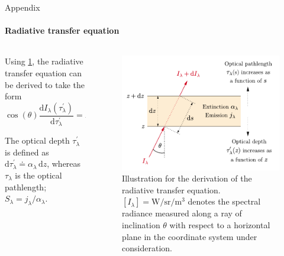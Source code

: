 \documentclass{beamer}
\begin{document}
\begin{frame}[allowframebreaks]{Appendix}
	\framesubtitle{Radiative transfer equation}
	\begin{columns} 
		\begin{column}{.6\textwidth}
			Using \cref{fig:radiative-transfer-equation}, the radiative transfer equation can be derived to take the form
			\begin{equation}\label{eq:transportequationdiffform_opt_depth}
				\cos(\theta)\frac{\mathrm{d}I_\lambda(\tau^\prime_\lambda)}{\mathrm{d}\tau^\prime_\lambda} = I_\lambda(\tau^\prime_\lambda) - S_\lambda(\tau^\prime_\lambda).
			\end{equation} 
			
			The optical depth $\tau_{\lambda}^\prime$ is defined as $\mathrm{d}\tau_{\lambda}^\prime \doteq \alpha_\lambda\,\mathrm{d}z$, whereas $\tau_{\lambda}$ is the optical pathlength; $S_\lambda = j_\lambda/\alpha_\lambda$.
		\end{column}
		\begin{column}{.4\textwidth}
			\begin{figure}[h]
				\centering
				\includegraphics[width=\textwidth]{figures/thesis/radiative-transfer-equation.pdf}
				\caption{Illustration for the derivation of the radiative transfer equation. $[I_\lambda] = \si{\watt\per\steradian\per\cubic\meter}$ denotes the spectral radiance measured along a ray of inclination $\theta$ with respect to a horizontal plane in the coordinate system under consideration.}
				\label{fig:radiative-transfer-equation}
			\end{figure}
		\end{column}%
	\end{columns}
	

\end{frame}
\end{document}
